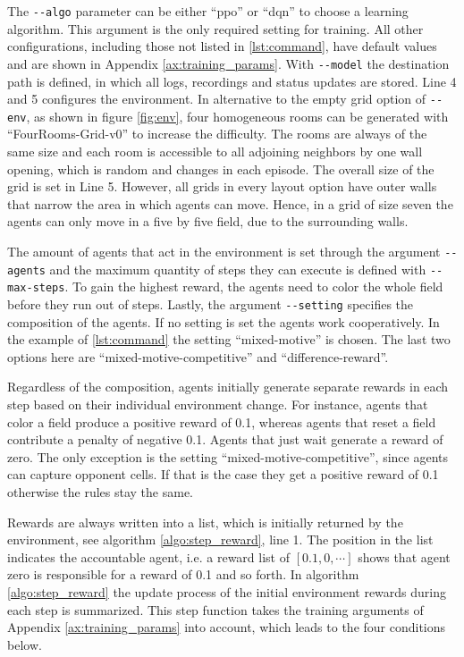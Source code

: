 The \verb|--algo| parameter can be either ``ppo'' or ``dqn'' to choose a learning algorithm. This argument is the only required setting for training. All other configurations, including those not listed in \ref{lst:command}, have default values and are shown in Appendix \ref{ax:training_params}.
With \verb|--model| the destination path is defined, in which all logs, recordings and status updates are stored. Line 4 and 5 configures the environment. In alternative to the empty grid option of \verb|--env|, as shown in figure \ref{fig:env}, four homogeneous rooms can be generated with ``FourRooms-Grid-v0'' to increase the difficulty. The rooms are always of the same size and each room is accessible to all adjoining neighbors by one wall opening, which is random and changes in each episode. The overall size of the grid is set in Line 5. However, all grids in every layout option have outer walls that narrow the area in which agents can move. Hence, in a grid of size seven the agents can only move in a five by five field, due to the surrounding walls.

The amount of agents that act in the environment is set through the argument \verb|--agents| and the maximum quantity of steps they can execute is defined with \verb|--max-steps|. To gain the highest reward, the agents need to color the whole field before they run out of steps. Lastly, the argument \verb|--setting| specifies the composition of the agents. If no setting is set the agents work cooperatively. In the example of \ref{lst:command} the setting ``mixed-motive'' is chosen. The last two options here are ``mixed-motive-competitive'' and ``difference-reward''. %

Regardless of the composition, agents initially generate separate rewards in each step based on their individual environment change. For instance, agents that color a field produce a positive reward of 0.1, whereas agents that reset a field contribute a penalty of negative 0.1. Agents that just wait generate a reward of zero. The only exception is the setting ``mixed-motive-competitive'', since agents can capture opponent cells. If that is the case they get a positive reward of 0.1 otherwise the rules stay the same. 

Rewards are always written into a list, which is initially returned by the environment, see algorithm \ref{algo:step_reward}, line 1. The position in the list indicates the accountable agent, i.e. a reward list of $[0.1, 0, \cdots ]$ shows that agent zero is responsible for a reward of 0.1 and so forth. In algorithm \ref{algo:step_reward} the update process of the initial environment rewards during each step is summarized. This step function takes the training arguments of Appendix \ref{ax:training_params} into account, which leads to the four conditions below.

